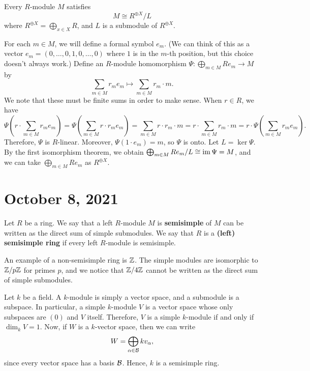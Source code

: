 \begin{prop}{}
    Every $R$-module $M$ satisfies 
    \[ M \cong R^{\oplus X}/L \] 
    where $R^{\oplus X} = \bigoplus_{x \in X} R$, and $L$ is a submodule of 
    $R^{\oplus X}$. 
\end{prop}
\begin{pf}
    For each $m \in M$, we will define a formal symbol $e_m$. 
    (We can think of this as a vector $e_m = (0, \dots, 0, 1, 0, \dots, 0)$ 
    where $1$ is in the $m$-th position, but this choice doesn't always work.)
    Define an $R$-module homomorphism $\Psi : \bigoplus_{m \in M} Re_m \to M$ by 
    \[ \sum_{m \in M} r_m e_m \mapsto \sum_{m \in M} r_m \cdot m. \] 
    We note that these must be finite sums in order to make sense. When $r \in R$, 
    we have 
    \[ \Psi\left(r \cdot \sum_{m \in M} r_m e_m \right) 
        = \Psi\left( \sum_{m \in M} r \cdot r_m e_m \right) 
        = \sum_{m \in M} r \cdot r_m \cdot m 
        = r \cdot \sum_{m \in M} r_m \cdot m 
        = r \cdot \Psi \left( \sum_{m \in M} r_m e_m \right). \] 
    Therefore, $\Psi$ is $R$-linear. Moreover, $\Psi(1 \cdot e_m) = m$, so 
    $\Psi$ is onto. Let $L = \ker\Psi$. By the first isomorphism theorem, 
    we obtain $\bigoplus_{m \in M} Re_m/L \cong \operatorname{im}\Psi = M$, 
    and we can take  $\bigoplus_{m \in M} Re_m$ as $R^{\oplus X}$. 
\end{pf}

\section{October 8, 2021}

\begin{defn}{}
    Let $R$ be a ring. We say that a left $R$-module $M$ is {\bf semisimple} 
    of $M$ can be written as the direct sum of simple submodules. We say that 
    $R$ is a {\bf (left) semisimple ring} if every left $R$-module is semisimple.
\end{defn}

\begin{exmp}{}
    An example of a non-semisimple ring is $\mathbb{Z}$. The simple modules are 
    isomorphic to $\mathbb{Z}/p\mathbb{Z}$ for primes $p$, and we notice that 
    $\mathbb{Z}/4\mathbb{Z}$ cannot be written as the direct sum of simple submodules. 
\end{exmp}

\begin{exmp}{}
    Let $k$ be a field. A $k$-module is simply a vector space, and a 
    submodule is a subspace. In particular, a simple $k$-module $V$ is a vector 
    space whose only subspaces are $(0)$ and $V$ itself. Therefore, $V$ 
    is a simple $k$-module if and only if $\dim_k V = 1$. Now, if 
    $W$ is a $k$-vector space, then we can write 
    \[ W = \bigoplus_{\alpha \in {\cal B}} kv_\alpha, \] 
    since every vector space has a basis ${\cal B}$. Hence, $k$ is a semisimple ring. 
\end{exmp}


